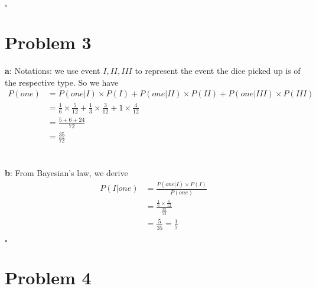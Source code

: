 \documentclass[12pt,letterpaper]{article}
\begin{document}
    \hfill\ensuremath{\square}

\section*{Problem 3}

    \textbf{a}: Notations: we use event $I, II, III$ to represent the event the dice picked up is of the respective type. So we have
        \begin{equation}
            \begin{aligned}
                P(one) &= P(one | I) \times P(I) + P(one | II) \times P(II) + P(one | III) \times P(III) \\
                &= \frac{1}{6} \times \frac{5}{12} + \frac{1}{3} \times \frac{3}{12} + 1 \times \frac{4}{12} \\
                &= \frac{5 + 6 + 24}{72} \\
                &= \frac{35}{72}
            \end{aligned}
        \end{equation}
    \\ \\
    \textbf{b}: From Bayesian's law, we derive
        \begin{equation}
            \begin{aligned}
                P(I | one) &= \frac{P(one | I) \times P(I)}{P(one)} \\
                &= \frac{\frac{1}{6} \times \frac{5}{12}}{\frac{35}{72}} \\
                &= \frac{5}{35} = \frac{1}{7}
            \end{aligned}
        \end{equation}

    \hfill\ensuremath{\square}

\section*{Problem 4}
\end{document}
